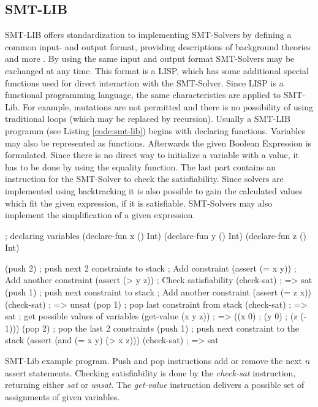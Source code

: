 \subsection{SMT-LIB}
SMT-LIB offers standardization to implementing SMT-Solvers by defining a common input- and output format, providing descriptions of background theories and more \cite{cokSMTLIBv2LanguageTools}. %
By using the same input and output format SMT-Solvers may be exchanged at any time. 
This format is a LISP, which has some additional special functions used for direct interaction with the SMT-Solver. Since LISP is a functional programming language, the same characteristics are applied to SMT-Lib.
For example, mutations are not permitted and there is no possibility of using traditional loops (which may be replaced by recursion).
Usually a SMT-LIB programm (see Listing \ref{code:smt-lib}) begins with declaring functions. Variables may also be represented as functions. 
Afterwards the given Boolean Expression is formulated. Since there is no direct way to initialize a variable with a value, it has to be done by using the equality function. 
The last part contains an instruction for the SMT-Solver to check the satisfiability. 
Since solvers are implemented using backtracking it is also possible to gain the calculated values which fit the given expression, if it is satisfiable. 
SMT-Solvers may also implement the simplification of a given expression.

\begin{program}[h!]
	\begin{LispCode}
		; declaring variables
		(declare-fun x () Int)
		(declare-fun y () Int)
		(declare-fun z () Int)
		
		(push 2) ; push next 2 constraints to stack
		; Add constraint
		(assert (= x y))
		; Add another constraint
		(assert (> y z))
		; Check satisfiability
		(check-sat)
		; => sat
		(push 1) ; push next constraint to stack
		; Add another constraint
		(assert (= z x))
		(check-sat)
		; => unsat
		(pop 1) ; pop last constraint from stack
		(check-sat)
		; => sat
		; get possible values of variables
		(get-value (x y z))
		; => ((x 0)
		;     (y 0)
		;     (z (- 1)))
		(pop 2) ; pop the last 2 constraints
		(push 1) ; push next constraint to the stack
		(assert (and (= x y) (> x z)))
		(check-sat)
		; => sat\end{LispCode}
	\caption{SMT-Lib example program. Push and pop instructions add or remove the next $n$ assert statements. Checking satisfiability is done by the \emph{check-sat} instruction, returning either \emph{sat} or \emph{unsat}. The \emph{get-value} instruction delivers a possible set of assignments of given variables. }
	\label{code:smt-lib}
\end{program}



